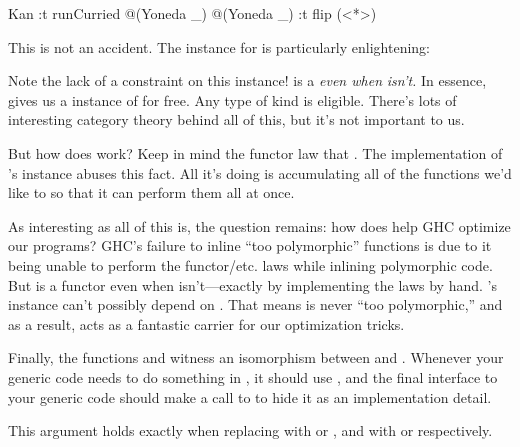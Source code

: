 \documentclass[book.tex]{subfiles}
\begin{document}
\begin{dorepl}{Kan}
:t runCurried @(Yoneda _) @(Yoneda _)
:t flip (<*>)
\end{dorepl}

This is not an accident. The  instance for 
is particularly enlightening:


Note the lack of a  constraint on this instance!  is
a  \emph{even when}  \emph{isn't.} In essence, 
gives us a instance of  for free. Any type of kind  is eligible. There's lots of interesting category theory behind all of
this, but it's not important to us.

But how does  work? Keep in mind the functor law that . The implementation of 's 
instance abuses this fact. All it's doing is accumulating all of the functions
we'd like to  so that it can perform them all at once.

As interesting as all of this is, the question remains: how does 
help GHC optimize our programs? GHC's failure to inline ``too polymorphic''
functions is due to it being unable to perform the functor/etc. laws while
inlining polymorphic code. But  is a functor even when 
isn't---exactly by implementing the  laws by hand. 's
 instance can't possibly depend on . That means 
is never ``too polymorphic,'' and as a result, acts as a fantastic carrier for
our optimization tricks.

Finally, the functions  and
 witness an \gls{isomorphism} between  and . Whenever your generic code needs to do something in ,
it should use , and the final interface to your generic code
should make a call to  to hide it as an implementation detail.

This argument holds exactly when replacing  with  or
, and  with  or  respectively.
\end{document}
